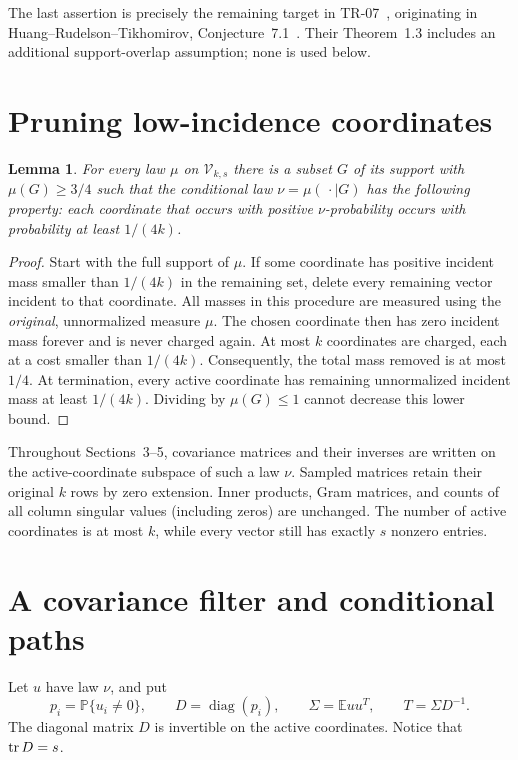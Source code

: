 \documentclass[11pt]{article}
\newtheorem{lemma}[theorem]{Lemma}
\theoremstyle{remark}\newtheorem{remark}[theorem]{Remark}
\newcommand{\E}{\mathbb E}\newcommand{\PP}{\mathbb P}
\newcommand{\diag}{\operatorname{diag}}\newcommand{\rank}{\operatorname{rank}}
\begin{document}
The last assertion is precisely the remaining target in TR-07~\cite{repo}, originating in Huang--Rudelson--Tikhomirov, Conjecture~7.1~\cite{hrt}. Their Theorem~1.3 includes an additional support-overlap assumption; none is used below.

\section{Pruning low-incidence coordinates}
\begin{lemma}\label{lem:prune}
For every law $\mu$ on $\mathcal V_{k,s}$ there is a subset $G$ of its support with $\mu(G)\ge3/4$ such that the conditional law $\nu=\mu(\,\cdot\mid G)$ has the following property: each coordinate that occurs with positive $\nu$-probability occurs with probability at least $1/(4k)$.
\end{lemma}
\begin{proof}
Start with the full support of $\mu$. If some coordinate has positive incident mass smaller than $1/(4k)$ in the remaining set, delete every remaining vector incident to that coordinate. All masses in this procedure are measured using the \emph{original}, unnormalized measure $\mu$. The chosen coordinate then has zero incident mass forever and is never charged again. At most $k$ coordinates are charged, each at a cost smaller than $1/(4k)$. Consequently, the total mass removed is at most $1/4$. At termination, every active coordinate has remaining unnormalized incident mass at least $1/(4k)$. Dividing by $\mu(G)\le1$ cannot decrease this lower bound.
\end{proof}

Throughout Sections~3--5, covariance matrices and their inverses are written on the active-coordinate subspace of such a law $\nu$. Sampled matrices retain their original $k$ rows by zero extension. Inner products, Gram matrices, and counts of all column singular values (including zeros) are unchanged. The number of active coordinates is at most $k$, while every vector still has exactly $s$ nonzero entries.

\section{A covariance filter and conditional paths}
Let $u$ have law $\nu$, and put
\[
 p_i=\PP\{u_i\ne0\},\qquad
 D=\diag(p_i),\qquad \Sigma=\E uu^T,\qquad T=\Sigma D^{-1}.
\]
The diagonal matrix $D$ is invertible on the active coordinates. Notice that $\operatorname{tr} D=s$.
\end{document}

